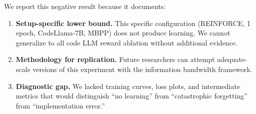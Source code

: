 We report this negative result because it documents:

\begin{enumerate}
    \item \textbf{Setup-specific lower bound.} This specific configuration (REINFORCE, 1 epoch, CodeLlama-7B, MBPP) does not produce learning. We cannot generalize to all code LLM reward ablation without additional evidence.
    \item \textbf{Methodology for replication.} Future researchers can attempt adequate-scale versions of this experiment with the information bandwidth framework.
    \item \textbf{Diagnostic gap.} We lacked training curves, loss plots, and intermediate metrics that would distinguish ``no learning'' from ``catastrophic forgetting'' from ``implementation error.''
\end{enumerate}
